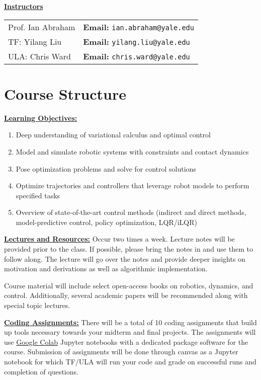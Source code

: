 \documentclass[11pt,letterpaper]{article}
\newcommand{\mysec}[1]{\medskip\noindent\underline{\textbf{#1}}}
\begin{document}
\mysec{Instructors} \\ 
\begin{tabular}{l l}
	Prof. Ian Abraham & \textbf{Email:} \texttt{ian.abraham@yale.edu} \\
	TF: Yilang Liu & \textbf{Email:} \texttt{yilang.liu@yale.edu}\\
	ULA: Chris Ward & \textbf{Email:} \texttt{chris.ward@yale.edu}
\end{tabular}

\newpage


\section*{Course Structure}

\mysec{Learning Objectives:} 
\begin{enumerate}[noitemsep]
	\item Deep understanding of variational calculus and optimal control
	\item Model and simulate robotic systems with constraints and contact dynamics
	\item Pose optimization problems and solve for control solutions
	\item Optimize trajectories and controllers that leverage robot models to perform specified tasks
	\item Overview of state-of-the-art control methods (indirect and direct methods, model-predictive control, policy optimization, LQR/iLQR)
\end{enumerate}


\mysec{Lectures and Resources:} Occur two times a week. Lecture notes will be provided prior to the class. If possible, please bring the notes in and use them to follow along. The lecture will go over the notes and provide deeper insights on motivation and derivations as well as algorithmic implementation. 

Course material will include select open-access books on robotics, dynamics, and control. Additionally, several academic papers will be recommended along with special topic lectures.  


\mysec{Coding Assignments:} There will be a total of 10 coding assignments that build up tools necessary towards your midterm and final projects. The assignments will use \href{https://colab.research.google.com/?utm_source=scs-index}{Google Colab} Jupyter notebooks with a dedicated package software for the course. Submission of assignments will be done through canvas as a Jupyter notebook for which TF/ULA will run your code and grade on successful runs and completion of questions.
\end{document}
